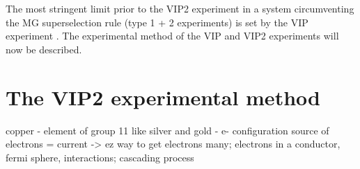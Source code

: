 The most stringent limit prior to the VIP2 experiment in a system circumventing the MG superselection rule (type 1 + 2 experiments) is set by the VIP experiment \cite{Curceanu2011}. The experimental method of the VIP and VIP2 experiments will now be described.

\section{The VIP2 experimental method}

copper - element of group 11 like silver and gold - e- configuration
source of electrons = current -> ez way to get electrons many; electrons in a conductor, fermi sphere, interactions; cascading process

